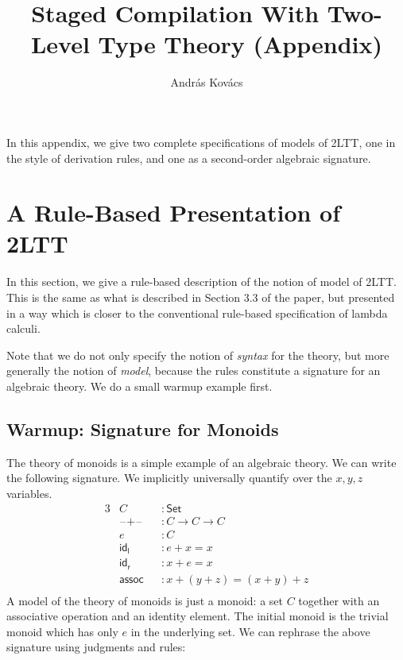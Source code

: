 \documentclass[acmsmall,screen]{acmart}
\newcommand{\mit}[1]{\mathit{#1}}
\newcommand{\msf}[1]{\mathsf{#1}}
\newcommand{\Set}{\mathsf{Set}}
\newcommand{\blank}{{\mathord{\hspace{1pt}\text{--}\hspace{1pt}}}}
\theoremstyle{remark}
\begin{document}
\title{Staged Compilation With Two-Level Type Theory (Appendix)}

\author{András Kovács}

\maketitle

In this appendix, we give two complete specifications of models of 2LTT,
one in the style of derivation rules, and one as a second-order algebraic
signature.

\section{A Rule-Based Presentation of 2LTT}\label{sec:rules}

In this section, we give a rule-based description of the notion of model of
2LTT. This is the same as what is described in Section 3.3 of the paper, but
presented in a way which is closer to the conventional rule-based specification
of lambda calculi.

Note that we do not only specify the notion of \emph{syntax} for the theory, but
more generally the notion of \emph{model}, because the rules constitute a
signature for an algebraic theory. We do a small warmup example first.

\subsection{Warmup: Signature for Monoids}

The theory of monoids is a simple example of an algebraic theory. We can write the
following signature. We implicitly universally quantify over the $x,y,z$ variables.
\begin{alignat*}{3}
  & C &&: \Set \\
  & \blank\!+\blank\! &&: C \to C \to C\\
  & \mit{e} &&: C \\
  & \msf{id_l} &&: \mit{e} + x = x\\
  & \msf{id_r} &&: x + \mit{e} = x\\
  & \msf{assoc} &&: x + (y + z) = (x + y) + z\\
\end{alignat*}
A model of the theory of monoids is just a monoid: a set $C$ together with an
associative operation and an identity element. The initial monoid is the trivial
monoid which has only $\mit{e}$ in the underlying set. We can rephrase the above
signature using judgments and rules:
\end{document}
